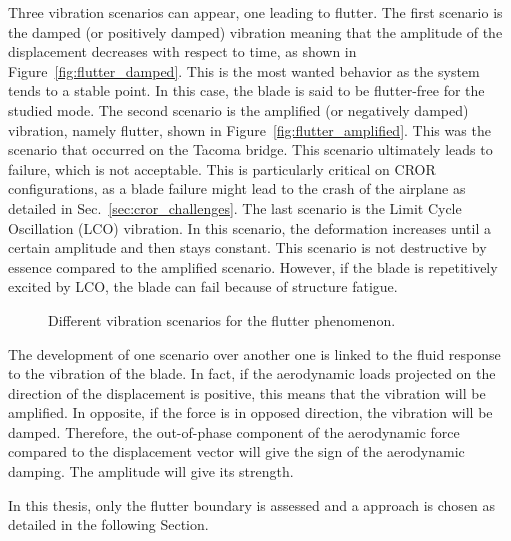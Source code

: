 Three vibration scenarios can appear, one leading to flutter.
The first scenario is the damped (or positively damped) 
vibration meaning
that the amplitude of the displacement decreases with respect to time, 
as shown in Figure~\ref{fig:flutter_damped}.
This is the most wanted behavior as the system tends to
a stable point. In this case, the blade is said to
be flutter-free for the studied mode.
The second scenario is the amplified (or negatively damped)
vibration, namely flutter, shown in Figure~\ref{fig:flutter_amplified}. 
This was the scenario that occurred on the Tacoma bridge. 
This scenario ultimately
leads to failure, which is not acceptable. This is particularly critical
on CROR configurations, as a blade failure might lead to 
the crash of the airplane as detailed in Sec.~\ref{sec:cror_challenges}.
The last scenario is the Limit Cycle Oscillation (LCO) vibration.
In this scenario, the deformation increases until a certain 
amplitude and then stays constant. This scenario is not
destructive by essence compared to the amplified scenario. However,
if the blade is repetitively excited by LCO, the blade
can fail because of structure fatigue.
\begin{figure}[htp]
  \centering
  \caption{Different vibration scenarios for the flutter phenomenon.}
\end{figure}

The development of one scenario over another one is linked to
the fluid response to the vibration of the blade. In fact,
if the aerodynamic loads projected on the direction of the displacement
is positive, this means that the vibration will be amplified. 
In opposite, if the force is in opposed direction, the vibration will be damped.
Therefore, the out-of-phase component of the aerodynamic force compared to
the displacement vector will give the sign of the aerodynamic damping.
The amplitude will give its strength. 

In this thesis, only the flutter boundary is assessed
and a  approach is chosen
as detailed in the following Section.
